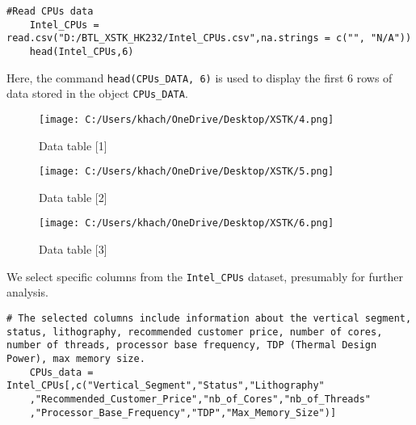 \documentclass[a4paper]{article}
\begin{document}
	\begin{lstlisting}[frame=single, backgroundcolor=\color{gray!10}, breaklines=true, columns=fullflexible]
	#Read CPUs data
	Intel_CPUs = read.csv("D:/BTL_XSTK_HK232/Intel_CPUs.csv",na.strings = c("", "N/A"))
	head(Intel_CPUs,6)
	\end{lstlisting}
	\vspace{0.5cm}
	Here, the command \texttt{head(CPUs\_DATA, 6)} is used to display the first 6 rows of data stored in the object \texttt{CPUs\_DATA}.\\
	\begin{figure}[htbp]
		\centering
		\begin{adjustbox}{width=1\textwidth, frame}
			\texttt{[image: C:/Users/khach/OneDrive/Desktop/XSTK/4.png]}
		\end{adjustbox}
		\captionsetup{justification=centering}
		\vspace{0.5cm}
		\caption{Data table [1]}
		\label{fig:data_table}
	\end{figure}
	\begin{figure}[htbp]
		\centering
		\begin{adjustbox}{width=1\textwidth, frame}
			\texttt{[image: C:/Users/khach/OneDrive/Desktop/XSTK/5.png]}
		\end{adjustbox}
		\captionsetup{justification=centering}
		\vspace{0.5cm}
		\caption{Data table [2]}
	\end{figure}
	\begin{figure}[htbp]
		\centering
		\begin{adjustbox}{width=1\textwidth, frame}
			\texttt{[image: C:/Users/khach/OneDrive/Desktop/XSTK/6.png]}
		\end{adjustbox}
		\captionsetup{justification=centering}
		\vspace{0.5cm}
		\caption{Data table [3]}
	\end{figure}
	\newpage
	We select specific columns from the \texttt{{{Intel\_CPUs}}} dataset, presumably for further analysis.
	\begin{lstlisting}[frame=single, backgroundcolor=\color{gray!10}, breaklines=true, columns=fullflexible]
	# The selected columns include information about the vertical segment, status, lithography, recommended customer price, number of cores, number of threads, processor base frequency, TDP (Thermal Design Power), max memory size.
	CPUs_data = Intel_CPUs[,c("Vertical_Segment","Status","Lithography"
	,"Recommended_Customer_Price","nb_of_Cores","nb_of_Threads"
	,"Processor_Base_Frequency","TDP","Max_Memory_Size")]
	\end{lstlisting}
\end{document}
